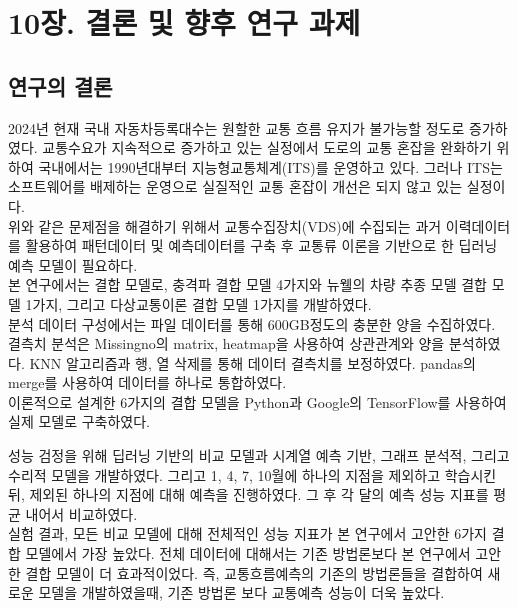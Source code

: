 \documentclass[11pt]{report}
\begin{document}
\chapter*{10장. 결론 및 향후 연구 과제}
\setcounter{chapter}{10}
\setcounter{section}{0}
\setcounter{subsection}{0}

\section{연구의 결론}
2024년 현재 국내 자동차등록대수는 원할한 교통 흐름 유지가 불가능할 정도로 증가하였다. 
교통수요가 지속적으로 증가하고 있는 실정에서 도로의 교통 혼잡을 완화하기 위하여  국내에서는 1990년대부터 지능형교통체계(ITS)를 운영하고 있다. 
그러나 ITS는 소프트웨어를 배제하는 운영으로 실질적인 교통 혼잡이 개선은 되지 않고 있는 실정이다. \\

\indent 위와 같은 문제점을 해결하기 위해서 교통수집장치(VDS)에 수집되는 과거 이력데이터를 활용하여 패턴데이터 및 예측데이터를 구축 후 교통류 이론을 기반으로 한 딥러닝 예측 모델이 필요하다. \\

\indent 본 연구에서는 결합 모델로, 충격파 결합 모델 4가지와 뉴웰의 차량 추종 모델 결합 모델 1가지, 그리고 다상교통이론 결합 모델 1가지를 개발하였다. \\

\indent 분석 데이터 구성에서는 파일 데이터를 통해 600GB정도의 충분한 양을 수집하였다. 
결측치 분석은 Missingno의 matrix, heatmap을 사용하여 상관관계와 양을 분석하였다. 
KNN 알고리즘과 행, 열 삭제를 통해 데이터 결측치를 보정하였다. 
pandas의 merge를 사용하여 데이터를 하나로 통합하였다. \\

\indent 이론적으로 설계한 6가지의 결합 모델을 Python과 Google의 TensorFlow를 사용하여 실제 모델로 구축하였다. 

\indent 성능 검정을 위해 딥러닝 기반의 비교 모델과 시계열 예측 기반, 그래프 분석적, 그리고 수리적 모델을 개발하였다. 
그리고 1, 4, 7, 10월에 하나의 지점을 제외하고 학습시킨 뒤, 제외된 하나의 지점에 대해 예측을 진행하였다. 
그 후 각 달의 예측 성능 지표를 평균 내어서 비교하였다. \\

\indent 실험 결과, 모든 비교 모델에 대해 전체적인 성능 지표가 본 연구에서 고안한 6가지 결합 모델에서 가장 높았다. 
전체 데이터에 대해서는 기존 방법론보다 본 연구에서 고안한 결합 모델이 더 효과적이었다. 
즉, 교통흐름예측의 기존의 방법론들을 결합하여 새로운 모델을 개발하였을때, 기존 방법론 보다 교통예측 성능이 더욱 높았다. \\
\end{document}
